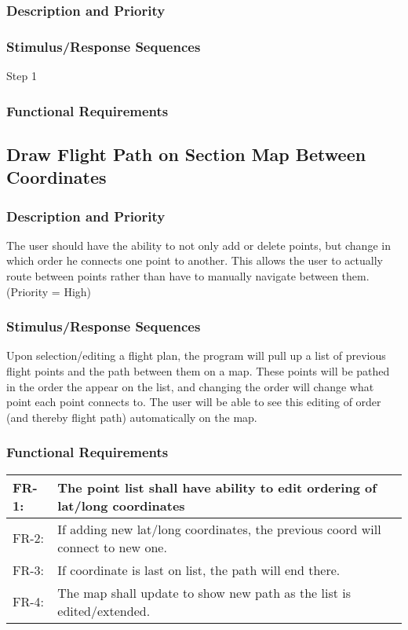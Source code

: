 \documentclass[12pt, letterpaper]{article}
\begin{document}
      \subsubsection{Description and Priority}
      \subsubsection{Stimulus/Response Sequences}
        \begin{description}
          \item[Step 1]
        \end{description}
      \subsubsection{Functional Requirements}

      \subsection{Draw Flight Path on Section Map Between Coordinates}
        \subsubsection{Description and Priority}
        		The user should have the ability to not only add or delete points, but change in which
        		order he connects one point to another. This allows the user to actually route between 
        		points rather than have to manually navigate between them. (Priority = High)
        \subsubsection{Stimulus/Response Sequences}
            Upon selection/editing a flight plan, the program will pull up a list of previous flight
            points and the path between them on a map. These points will be pathed in the order the
            appear on the list, and changing the order will change what point each point connects to.
            The user will be able to see this editing of order (and thereby flight path) automatically
            on the map.
        \subsubsection{Functional Requirements}
			\begin{tabularx}{\textwidth}{|l|X|}
    				\hline
    				FR-1: & The point list shall have ability to edit ordering of lat/long coordinates\\ \hline
     			FR-2: & If adding new lat/long coordinates, the previous coord will connect to new one.\\ \hline
      			FR-3: & If coordinate is last on list, the path will end there.\\ \hline
      			FR-4: & The map shall update to show new path as the list is edited/extended.\\ \hline
    			\end{tabularx}
\end{document}
